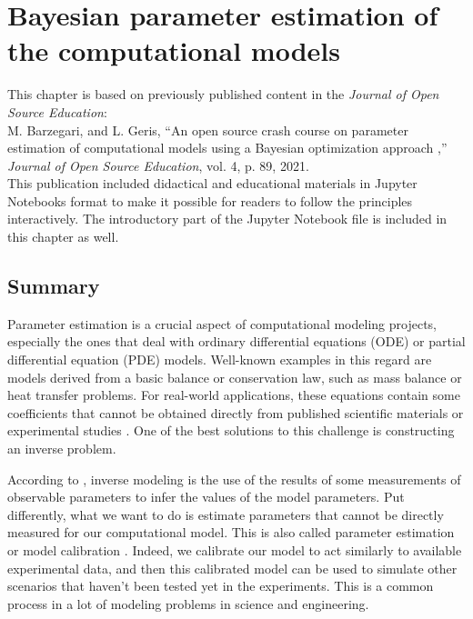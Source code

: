 \chapter{Bayesian parameter estimation of the computational models}\label{ch:bayesian}

\begin{tcolorbox}
This chapter is based on previously published content in the \textit{Journal of Open Source Education}:\\
M. Barzegari, and L. Geris, ``An open source crash course on parameter estimation of computational models using a Bayesian optimization approach
,'' \textit{Journal of Open Source Education}, vol. 4, p. 89, 2021.\\
This publication included didactical and educational materials in Jupyter Notebooks format to make it possible for readers to follow the principles interactively. The introductory part of the Jupyter Notebook file is included in this chapter as well.
\end{tcolorbox}

\section{Summary}

Parameter estimation is a crucial aspect of computational modeling projects, especially the ones that deal with ordinary differential equations (\gls{ODE}) or partial differential equation (\gls{PDE}) models. Well-known examples in this regard are models derived from a basic balance or conservation law, such as mass balance or heat transfer problems. For real-world applications, these equations contain some coefficients that cannot be obtained directly from published scientific materials or experimental studies \cite{Dehghan2001}. One of the best solutions to this challenge is constructing an inverse problem.

According to \cite{Tarantola1987}, inverse modeling is the use of the results of some measurements of observable parameters to infer the values of the model parameters. Put differently, what we want to do is estimate parameters that cannot be directly measured for our computational model. This is also called parameter estimation or model calibration \cite{Carson2014}. Indeed, we calibrate our model to act similarly to available experimental data, and then this calibrated model can be used to simulate other scenarios that haven't been tested yet in the experiments. This is a common process in a lot of modeling problems in science and engineering.

